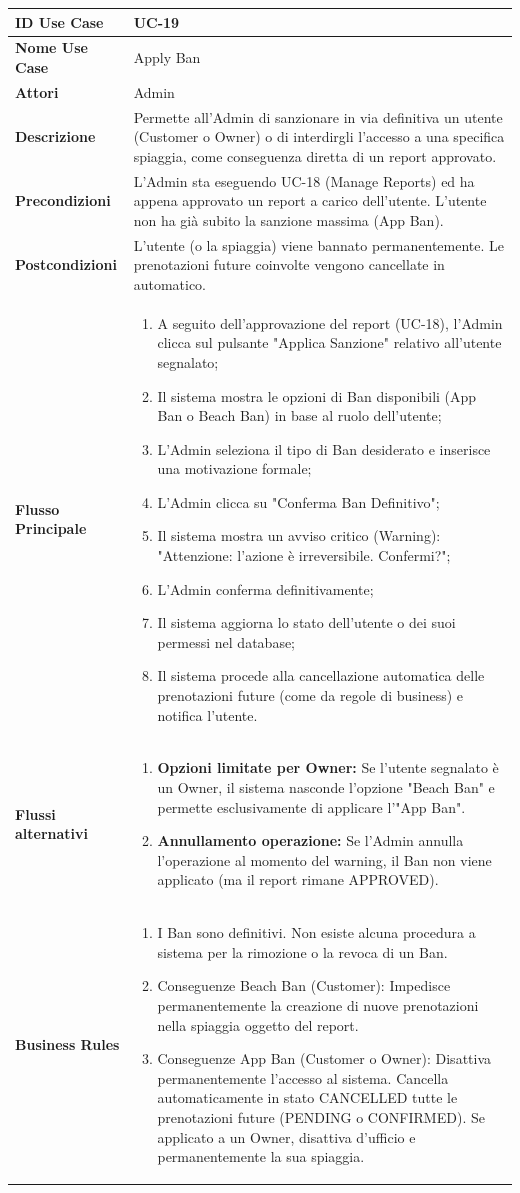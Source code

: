 \documentclass{article}
\newcommand{\usecasetable}[9]{
	\begin{table}[h!]
		\centering
		\footnotesize
		\renewcommand{\arraystretch}{1.4}
		\begin{tabularx}{\textwidth}{|l|>{\raggedright\arraybackslash}X|}
			\hline
			\textbf{ID Use Case} & #1 \\ \hline
			\textbf{Nome Use Case} & #2 \\ \hline
			\textbf{Attori} & #3 \\ \hline
			\textbf{Descrizione} & #4 \\ \hline
			\textbf{Precondizioni} & #5 \\ \hline
			\textbf{Postcondizioni} & #6 \\ \hline
			\textbf{Flusso Principale} & #7 \\ \hline
			\textbf{Flussi alternativi} & #8 \\ \hline
			\textbf{Business Rules} & #9 \\ \hline
		\end{tabularx}
	\end{table}
}
\begin{document}
	\newpage
	
	\usecasetable
	{UC-19}
	{Apply Ban}
	{Admin}
	{Permette all'Admin di sanzionare in via definitiva un utente (Customer o Owner) o di interdirgli l'accesso a una specifica spiaggia, come conseguenza diretta di un report approvato.}
	{L'Admin sta eseguendo UC-18 (Manage Reports) ed ha appena approvato un report a carico dell'utente. L'utente non ha già subito la sanzione massima (App Ban).}
	{L'utente (o la spiaggia) viene bannato permanentemente. Le prenotazioni future coinvolte vengono cancellate in automatico.}
	{
		\begin{enumerate}[nosep, leftmargin=*]
			\item A seguito dell'approvazione del report (UC-18), l'Admin clicca sul pulsante "Applica Sanzione" relativo all'utente segnalato;
			\item Il sistema mostra le opzioni di Ban disponibili (App Ban o Beach Ban) in base al ruolo dell'utente;
			\item L'Admin seleziona il tipo di Ban desiderato e inserisce una motivazione formale;
			\item L'Admin clicca su "Conferma Ban Definitivo";
			\item Il sistema mostra un avviso critico (Warning): "Attenzione: l'azione è irreversibile. Confermi?";
			\item L'Admin conferma definitivamente;
			\item Il sistema aggiorna lo stato dell'utente o dei suoi permessi nel database;
			\item Il sistema procede alla cancellazione automatica delle prenotazioni future (come da regole di business) e notifica l'utente.
		\end{enumerate}
	}
	{
		\begin{enumerate}[nosep, leftmargin=25px]
			\item[\textbf{2a.}] \textbf{Opzioni limitate per Owner:} Se l'utente segnalato è un Owner, il sistema nasconde l'opzione "Beach Ban" e permette esclusivamente di applicare l'"App Ban".
			\item[\textbf{5a-e.}] \textbf{Annullamento operazione:} Se l'Admin annulla l'operazione al momento del warning, il Ban non viene applicato (ma il report rimane APPROVED).
		\end{enumerate}
	}
	{
		\begin{enumerate}[nosep, leftmargin=*]
			\item[•] I Ban sono definitivi. Non esiste alcuna procedura a sistema per la rimozione o la revoca di un Ban.
			\item[•] Conseguenze Beach Ban (Customer): Impedisce permanentemente la creazione di nuove prenotazioni nella spiaggia oggetto del report.
			\item[•] Conseguenze App Ban (Customer o Owner): Disattiva permanentemente l'accesso al sistema. Cancella automaticamente in stato CANCELLED tutte le prenotazioni future (PENDING o CONFIRMED). Se applicato a un Owner, disattiva d'ufficio e permanentemente la sua spiaggia.
		\end{enumerate}
	}
\end{document}
